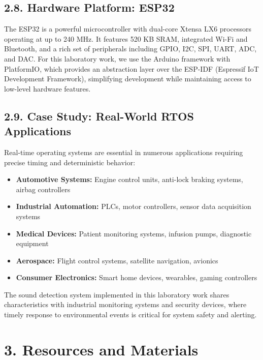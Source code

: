 \documentclass[12pt]{article}
\begin{document}
\subsection*{2.8. Hardware Platform: ESP32}

The ESP32 is a powerful microcontroller with dual-core Xtensa LX6 processors operating at up to 240 MHz. It features 520 KB SRAM, integrated Wi-Fi and Bluetooth, and a rich set of peripherals including GPIO, I2C, SPI, UART, ADC, and DAC. For this laboratory work, we use the Arduino framework with PlatformIO, which provides an abstraction layer over the ESP-IDF (Espressif IoT Development Framework), simplifying development while maintaining access to low-level hardware features.

\subsection*{2.9. Case Study: Real-World RTOS Applications}

Real-time operating systems are essential in numerous applications requiring precise timing and deterministic behavior:

\begin{itemize}
    \item \textbf{Automotive Systems:} Engine control units, anti-lock braking systems, airbag controllers
    \item \textbf{Industrial Automation:} PLCs, motor controllers, sensor data acquisition systems
    \item \textbf{Medical Devices:} Patient monitoring systems, infusion pumps, diagnostic equipment
    \item \textbf{Aerospace:} Flight control systems, satellite navigation, avionics
    \item \textbf{Consumer Electronics:} Smart home devices, wearables, gaming controllers
\end{itemize}

The sound detection system implemented in this laboratory work shares characteristics with industrial monitoring systems and security devices, where timely response to environmental events is critical for system safety and alerting.

\section*{3. Resources and Materials}
\end{document}
